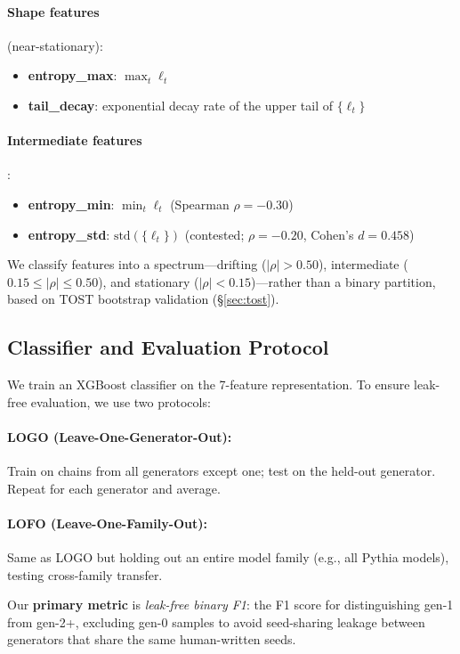 \documentclass[11pt,a4paper]{article}
\begin{document}
\paragraph{Shape features} (near-stationary):
\begin{itemize}
    \item \textbf{entropy\_max}: $\max_t \ell_t$
    \item \textbf{tail\_decay}: exponential decay rate of the upper tail of $\{\ell_t\}$
\end{itemize}

\paragraph{Intermediate features}:
\begin{itemize}
    \item \textbf{entropy\_min}: $\min_t \ell_t$ (Spearman $\rho = -0.30$)
    \item \textbf{entropy\_std}: $\text{std}(\{\ell_t\})$ (contested; $\rho = -0.20$, Cohen's $d = 0.458$)
\end{itemize}

We classify features into a spectrum---drifting ($|\rho| > 0.50$), intermediate ($0.15 \leq |\rho| \leq 0.50$), and stationary ($|\rho| < 0.15$)---rather than a binary partition, based on TOST bootstrap validation (\S\ref{sec:tost}).

\subsection{Classifier and Evaluation Protocol}
We train an XGBoost classifier on the 7-feature representation.
To ensure leak-free evaluation, we use two protocols:

\paragraph{LOGO (Leave-One-Generator-Out):} Train on chains from all generators except one; test on the held-out generator. Repeat for each generator and average.

\paragraph{LOFO (Leave-One-Family-Out):} Same as LOGO but holding out an entire model family (e.g., all Pythia models), testing cross-family transfer.

Our \textbf{primary metric} is \emph{leak-free binary F1}: the F1 score for distinguishing gen-1 from gen-2+, excluding gen-0 samples to avoid seed-sharing leakage between generators that share the same human-written seeds.
\end{document}

